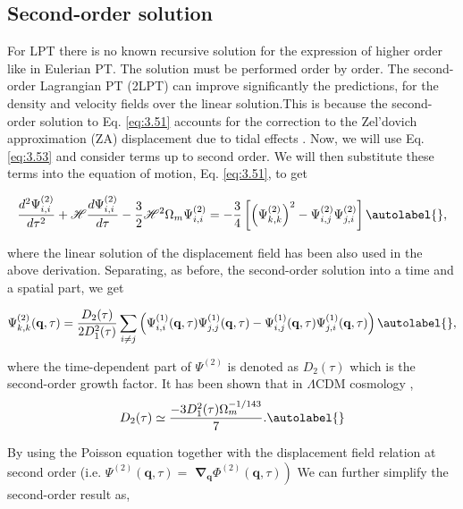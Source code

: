 \subsection{Second-order solution}
For LPT there is no known recursive solution for the expression of higher order like in Eulerian PT. The solution must be performed order by order. The second-order Lagrangian PT (2LPT) can improve significantly the predictions, for the density and velocity fields over the linear solution.This is because the second-order solution to Eq. \eqref{eq:3.51} accounts for the correction to the Zel'dovich approximation (ZA) displacement due to tidal effects \cite{buchert1994A&A...288..349B, Melot1995A&A...294..345M, bouchet1996introductory,Bernardeau_2002}. Now, we will use Eq. \eqref{eq:3.53} and consider terms up to second order. We will then substitute these terms into the equation of motion, Eq. \eqref{eq:3.51}, to get


\begin{equation}
    \frac{d^{2} \Psi_{i, i}^{(2)}}{d \tau^{2}}+\mathcal{H} \frac{d \Psi_{i, i}^{(2)}}{d \tau}-\frac{3}{2} \mathcal{H}^{2} \Omega_{m} \Psi_{i, i}^{(2)}=-\frac{3}{4}\left[\left(\Psi_{k, k}^{(2)}\right)^{2}-\Psi_{i, j}^{(2)} \Psi_{j, i}^{(2)}\right] \autolabel{},
\end{equation}


where the linear solution of the displacement field has been also used in the above derivation. Separating, as before, the second-order solution into a time and a spatial part, we get


\begin{equation}
    \Psi_{k, k}^{(2)}(\mathbf{q}, \tau)=\frac{D_{2}(\tau)}{2 D_{1}^{2}(\tau)} \sum_{i \neq j}\left(\Psi_{i, i}^{(1)}(\mathbf{q}, \tau) \Psi_{j, j}^{(1)}(\mathbf{q}, \tau)-\Psi_{i, j}^{(1)}(\mathbf{q}, \tau) \Psi_{j, i}^{(1)}(\mathbf{q}, \tau)\right) \autolabel{},
\end{equation}


where the time-dependent part of $\Psi^{(2)}$ is denoted as $D_{2}(\tau)$ which is the  second-order growth factor. It has been shown that in $\Lambda$CDM cosmology\cite{bouchet1996introductory} ,
\begin{equation}
    D_{2}(\tau) \simeq \frac{-3 D_{1}^{2}(\tau) \Omega_{m}^{-1 / 143}}{7} . \autolabel{}
\end{equation}

By using the Poisson equation together with the displacement field relation at second order (i.e. $\Psi^{(2)}(\mathbf{q}, \tau)=$ $\left.\boldsymbol{\nabla}_{\mathbf{q}} \Phi^{(2)}(\mathbf{q}, \tau)\right)$ We can further simplify the second-order result as,


